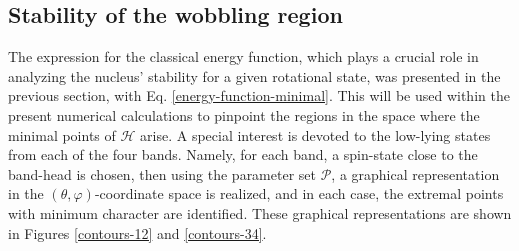 \documentclass[11pt]{article}
\begin{document}
\subsection{Stability of the wobbling region}

The expression for the classical energy function, which plays a crucial role in analyzing the nucleus' stability for a given rotational state, was presented in the previous section, with Eq. \ref{energy-function-minimal}. This will be used within the present numerical calculations to pinpoint the regions in the space where the minimal points of $\mathcal{H}$ arise. A special interest is devoted to the low-lying states from each of the four bands. Namely, for each band, a spin-state close to the band-head is chosen, then using the parameter set $\mathcal{P}$, a graphical representation in the $(\theta,\varphi)$-coordinate space is realized, and in each case, the extremal points with minimum character are identified. These graphical representations are shown in Figures \ref{contours-12} and \ref{contours-34}.
\end{document}
